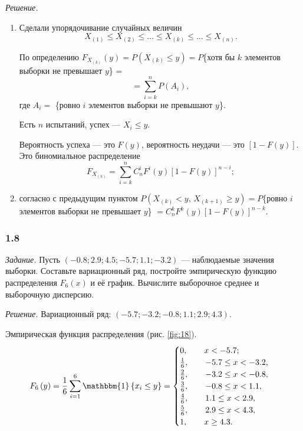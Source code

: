 \textit{Решение.}
\begin{enumerate}[label=\alph*)]
  \item Сделали упорядочивание случайных величин
  $$X_{ \left( 1 \right) } \leq
    X_{ \left( 2 \right) } \leq
    \dotsc \leq
    X_{ \left( k \right) } \leq
    \dotsc \leq
    X_{ \left( n \right)}.$$

  По определению
  $F_{X_{ \left( k \right) }} \left( y \right) =
    P \left( X_{ \left( k \right) } \leq y \right) =
    P$\{хотя бы $k$ элементов выборки не превышает $y$\} =
  $$= \sum \limits_{i = k}^n P(A_i),$$
  где $A_i =$ \{ровно $i$ элементов выборки не превышают $y$\}.

  Есть $n$ испытаний, успех --- $X_i \leq y$.

  Вероятность успеха --- это $F \left( y \right) $, вероятность неудачи ---
  это $ \left[ 1 - F \left( y \right) \right] $.
  Это биномиальное распределение
  $$F_{X_{ \left( k \right) }} =
    \sum \limits_{i = k}^n
      C_n^i F^i \left( y \right) \left[ 1 - F \left( y \right) \right]^{n - i};$$
  \item согласно с предыдущим пунктом
  $P \left( X_{ \left( k \right) } < y, \, X_{ \left( k + 1 \right) } \geq y \right) =
    P$\{ровно $i$ элементов выборки не превышает $y$\} $=
    C_n^k F^k \left( y \right) \left[ 1 - F \left( y \right) \right]^{n - k}$.
\end{enumerate}

\subsubsection*{1.8}

\textit{Задание.}
Пусть $ \left( -0.8; 2.9; 4.5; -5.7; 1.1; -3.2 \right) $ --- наблюдаемые значения выборки.
Составьте вариационный ряд,
постройте эмпирическую функцию распределения $F_6 \left( x \right) $ и её график.
Вычислите выборочное среднее и выборочную дисперсию.

\textit{Решение.} Вариационный ряд: $ \left( -5.7; -3.2; -0.8; 1.1; 2.9; 4.3 \right) $.

Эмпирическая функция распределения (рис. \ref{fig:18}).
$$F_6 \left( y \right) =
  \frac{1}{6} \sum \limits_{i = 1}^6 \mathbbm{1} \left\{ x_i \leq y \right\} =
  \begin{cases}
    0, \qquad x < -5.7; \\
    \frac{1}{6}, \qquad -5.7 \leq x < -3.2, \\
    \frac{2}{6}, \qquad -3.2 \leq x < -0.8, \\
    \frac{3}{6}, \qquad -0.8 \leq x < 1.1, \\
    \frac{4}{6}, \qquad 1.1 \leq x < 2.9, \\
    \frac{5}{6}, \qquad 2.9 \leq x < 4.3, \\
    1, \qquad x \geq 4.3.
  \end{cases}$$

